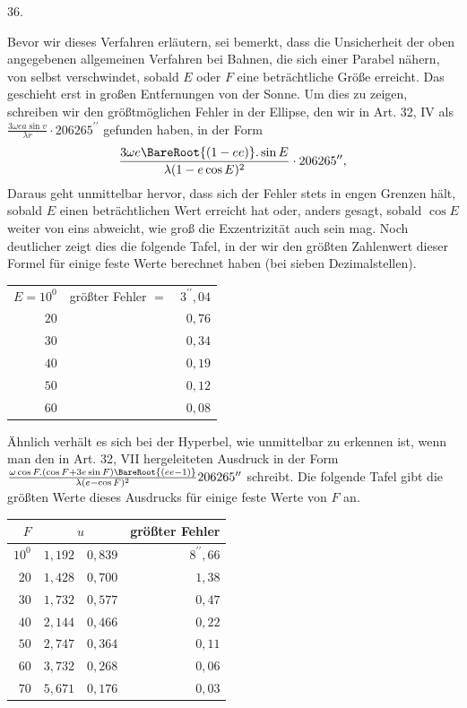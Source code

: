 \par{}
\begin{center}
\hypertarget{native-053-article036}{}36.
\end{center}
Bevor wir dieses Verfahren erläutern, sei bemerkt, dass die Unsicherheit der oben angegebenen allgemeinen Verfahren bei Bahnen, die sich einer Parabel nähern, von selbst verschwindet, sobald $E$ oder $F$ eine beträchtliche Größe erreicht. Das geschieht erst in großen Entfernungen von der Sonne. Um dies zu zeigen, schreiben wir den größtmöglichen Fehler in der Ellipse, den wir in Art. 32, IV als $\frac{3\omega ea\sin v}{\lambda r}\cdot206265^{\prime\prime}$ gefunden haben, in der Form
\[
\frac{3\omega e\BareRoot{(1-ee)}.\sin E}{\lambda(1-e\cos E)^2}\cdot206265^{\prime\prime},
\]
Daraus geht unmittelbar hervor, dass sich der Fehler stets in engen Grenzen hält, sobald $E$ einen beträchtlichen Wert erreicht hat oder, anders gesagt, sobald $\cos E$ weiter von eins abweicht, wie groß die Exzentrizität auch sein mag. Noch deutlicher zeigt dies die folgende Tafel, in der wir den größten Zahlenwert dieser Formel für einige feste Werte berechnet haben (bei sieben Dezimalstellen).
\begin{center}
\begin{tabular}{r|lr}
$E=10^0$ & größter Fehler $=$ & $3^{\prime\prime}{,}04$\\
$20$ & & $0{,}76$\\
$30$ & & $0{,}34$\\
$40$ & & $0{,}19$\\
$50$ & & $0{,}12$\\
$60$ & & $0{,}08$
\end{tabular}
\end{center}
\noindent Ähnlich verhält es sich bei der Hyperbel, wie unmittelbar zu erkennen ist, wenn man den in Art. 32, VII hergeleiteten Ausdruck in der Form $\frac{\omega\cos F.(\cos F+3e\sin F)\BareRoot{(ee-1)}}{\lambda(e-\cos F)^2}206265^{\prime\prime}$ schreibt. Die folgende Tafel gibt die größten Werte dieses Ausdrucks für einige feste Werte von $F$ an.
\begin{center}
\begin{tabular}{r|r|r|r}
\hline
$F$ & \multicolumn{2}{c|}{$u$} & größter Fehler\\
\hline
$10^0$ & $1{,}192$ & $0{,}839$ & $8^{\prime\prime}{,}66$\\
$20$ & $1{,}428$ & $0{,}700$ & $1{,}38$\\
$30$ & $1{,}732$ & $0{,}577$ & $0{,}47$\\
$40$ & $2{,}144$ & $0{,}466$ & $0{,}22$\\
$50$ & $2{,}747$ & $0{,}364$ & $0{,}11$\\
$60$ & $3{,}732$ & $0{,}268$ & $0{,}06$\\
$70$ & $5{,}671$ & $0{,}176$ & $0{,}03$
\end{tabular}
\end{center}
